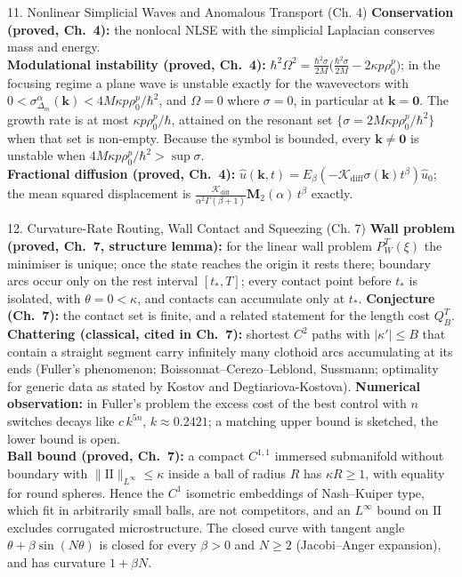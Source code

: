 \documentclass[11pt,a4paper,oneside]{article}
\newcommand{\II}{\mathrm{II}}
\begin{document}
\begin{conceptbox}{{11. Nonlinear Simplicial Waves and Anomalous Transport (Ch. 4)}}
\textbf{Conservation (proved, Ch.~4):} the nonlocal NLSE with the simplicial Laplacian conserves mass and energy.\\
\textbf{Modulational instability (proved, Ch.~4):} $\hbar^2\Omega^2 = \frac{\hbar^2\sigma}{2M}\big(\frac{\hbar^2\sigma}{2M} - 2\kappa p\rho_0^p\big)$; in the focusing regime a plane wave is unstable exactly for the wavevectors with $0 < \sigma_{\Delta_m}^\alpha(\mathbf{k}) < 4M\kappa p\rho_0^p/\hbar^2$, and $\Omega = 0$ where $\sigma = 0$, in particular at $\mathbf{k} = \mathbf{0}$. The growth rate is at most $\kappa p\rho_0^p/\hbar$, attained on the resonant set $\{\sigma = 2M\kappa p\rho_0^p/\hbar^2\}$ when that set is non-empty. Because the symbol is bounded, every $\mathbf{k} \ne \mathbf{0}$ is unstable when $4M\kappa p\rho_0^p/\hbar^2 > \sup\sigma$.\\
\textbf{Fractional diffusion (proved, Ch.~4):} $\widehat u(\mathbf{k}, t) = E_\beta(-\mathcal{K}_{\mathrm{diff}}\sigma(\mathbf{k})t^\beta)\widehat u_0$; the mean squared displacement is $\frac{\mathcal{K}_{\mathrm{diff}}}{\alpha^2\Gamma(\beta+1)}\mathbf{M}_2(\alpha)\,t^\beta$ exactly.
\end{conceptbox}

\begin{conceptbox}{{12. Curvature-Rate Routing, Wall Contact and Squeezing (Ch. 7)}}
\textbf{Wall problem (proved, Ch.~7, structure lemma):} for the linear wall problem $P_W^T(\xi)$ the minimiser is unique; once the state reaches the origin it rests there; boundary arcs occur only on the rest interval $[t_*, T]$; every contact point before $t_*$ is isolated, with $\theta = 0 < \kappa$, and contacts can accumulate only at $t_*$. \textbf{Conjecture (Ch.~7):} the contact set is finite, and a related statement for the length cost $Q_B^T$.\\
\textbf{Chattering (classical, cited in Ch.~7):} shortest $C^2$ paths with $|\kappa'| \le B$ that contain a straight segment carry infinitely many clothoid arcs accumulating at its ends (Fuller's phenomenon; Boissonnat--Cerezo--Leblond, Sussmann; optimality for generic data as stated by Kostov and Degtiariova-Kostova). \textbf{Numerical observation:} in Fuller's problem the excess cost of the best control with $n$ switches decays like $c\,k^{5n}$, $k \approx 0.2421$; a matching upper bound is sketched, the lower bound is open.\\
\textbf{Ball bound (proved, Ch.~7):} a compact $C^{1,1}$ immersed submanifold without boundary with $\|\II\|_{L^\infty} \le \kappa$ inside a ball of radius $R$ has $\kappa R \ge 1$, with equality for round spheres. Hence the $C^1$ isometric embeddings of Nash--Kuiper type, which fit in arbitrarily small balls, are not competitors, and an $L^\infty$ bound on $\II$ excludes corrugated microstructure. The closed curve with tangent angle $\theta + \beta\sin(N\theta)$ is closed for every $\beta > 0$ and $N \ge 2$ (Jacobi--Anger expansion), and has curvature $1 + \beta N$.
\end{conceptbox}
\end{document}
